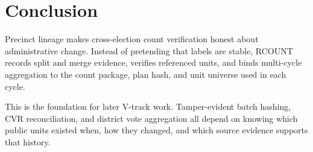 \section{Conclusion}

Precinct lineage makes cross-election count verification honest about
administrative change. Instead of pretending that labels are stable, RCOUNT
records split and merge evidence, verifies referenced units, and binds
multi-cycle aggregation to the count package, plan hash, and unit universe used
in each cycle.

This is the foundation for later V-track work. Tamper-evident batch hashing,
CVR reconciliation, and district vote aggregation all depend on knowing which
public units existed when, how they changed, and which source evidence supports
that history.
